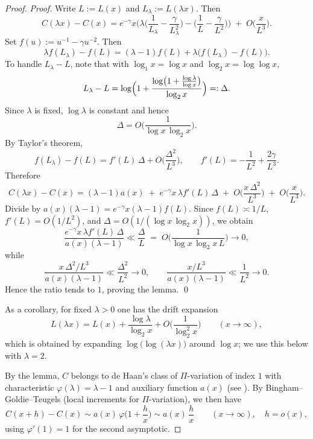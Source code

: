 \documentclass[12pt]{article}
\theoremstyle{remark}
\begin{document}
\begin{proof}
\textit{Proof.} Write $L:=L(x)$ and $L_\lambda:=L(\lambda x)$. Then
\[
 C(\lambda x)-C(x)
 =e^{-\gamma}x\Big(\lambda\Big(\frac{1}{L_\lambda}-\frac{\gamma}{L_\lambda^2}\Big)
 -\Big(\frac{1}{L}-\frac{\gamma}{L^2}\Big)\Big)\;+
 \;O\Big(\frac{x}{L^3}\Big).
\]
Set $f(u):=u^{-1}-\gamma u^{-2}$. Then
\[
 \lambda f(L_\lambda)-f(L)=(\lambda-1)f(L)+\lambda\bigl(f(L_\lambda)-f(L)\bigr).
\]
To handle $L_\lambda-L$, note that with $\log_1 x=\log x$ and $\log_2 x=\log\log x$,
\[
 L_\lambda-L
 =\log\Bigl(1+\frac{\log\bigl(1+\tfrac{\log\lambda}{\log x}\bigr)}{\log_2 x}\Bigr)
 =:\Delta.
\]
Since $\lambda$ is fixed, $\log\lambda$ is constant and hence
\[
 \Delta=O\!\Big(\frac{1}{\log x\,\log_2 x}\Big).
\]
By Taylor's theorem,
\[
 f(L_\lambda)-f(L)=f'(L)\,\Delta+O\Big(\frac{\Delta^2}{L^3}\Big),\qquad f'(L)=-\frac{1}{L^2}+\frac{2\gamma}{L^3}.
\]
Therefore
\[
 C(\lambda x)-C(x)=(\lambda-1)a(x)\;+
 \;e^{-\gamma}x\,\lambda f'(L)\,\Delta
 \;+
 \;O\Big(\frac{x\,\Delta^2}{L^3}\Big)
 \;+
 \;O\Big(\frac{x}{L^3}\Big).
\]
Divide by $a(x)(\lambda-1)=e^{-\gamma}x(\lambda-1)f(L)$. Since $f(L)\asymp 1/L$, $f'(L)=O(1/L^2)$, and $\Delta=O(1/(\log x\,\log_2 x))$, we obtain
\[
 \frac{e^{-\gamma}x\,\lambda f'(L)\,\Delta}{a(x)(\lambda-1)}
 \ll \frac{\Delta}{L}\;=\;O\!\Big(\frac{1}{\log x\,\log_2 x\,L}\Big)\to 0,
\]
while
\[
 \frac{x\,\Delta^2/L^3}{a(x)(\lambda-1)}\ll \frac{\Delta^2}{L^2}\to 0,\qquad
 \frac{x/L^3}{a(x)(\lambda-1)}\ll \frac{1}{L^2}\to 0.
\]
Hence the ratio tends to $1$, proving the lemma. \qed

As a corollary, for fixed $\lambda>0$ one has the drift expansion
\begin{equation}\label{eq:L-drift}
 L(\lambda x)=L(x)+\frac{\log\lambda}{\log_2 x}+O\!\Big(\frac{1}{\log_2^2 x}\Big)\qquad(x\to\infty),
\end{equation}
which is obtained by expanding $\log\bigl(\log(\lambda x)\bigr)$ around $\log x$; we use this below with $\lambda=2$.

By the lemma, $C$ belongs to de Haan's class of $\Pi$-variation of index $1$ with characteristic $\varphi(\lambda)=\lambda-1$ and auxiliary function $a(x)$ (see \cite[\S3.7]{BGT1989}). By Bingham--Goldie--Teugels \cite[Th.~3.7.2]{BGT1989} (local increments for $\Pi$-variation), we then have
\[
 C(x+h)-C(x)\sim a(x)\,\varphi\!\Big(1+\frac{h}{x}\Big)\sim a(x)\,\frac{h}{x}
 \qquad (x\to\infty),\quad h=o(x),
\]
using $\varphi'(1)=1$ for the second asymptotic.


\end{proof}
\end{document}
